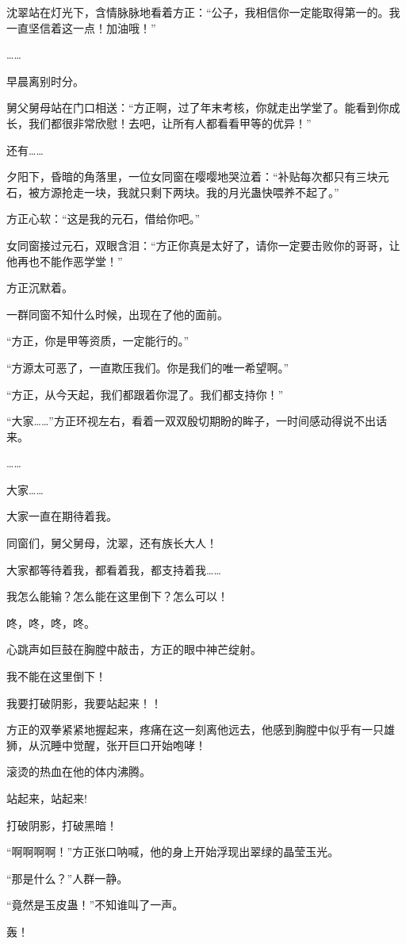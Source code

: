 \begin{this_body}
沈翠站在灯光下，含情脉脉地看着方正：“公子，我相信你一定能取得第一的。我一直坚信着这一点！加油哦！”

……

早晨离别时分。

舅父舅母站在门口相送：“方正啊，过了年末考核，你就走出学堂了。能看到你成长，我们都很非常欣慰！去吧，让所有人都看看甲等的优异！”

还有……

夕阳下，昏暗的角落里，一位女同窗在嘤嘤地哭泣着：“补贴每次都只有三块元石，被方源抢走一块，我就只剩下两块。我的月光蛊快喂养不起了。”

方正心软：“这是我的元石，借给你吧。”

女同窗接过元石，双眼含泪：“方正你真是太好了，请你一定要击败你的哥哥，让他再也不能作恶学堂！”

方正沉默着。

一群同窗不知什么时候，出现在了他的面前。

“方正，你是甲等资质，一定能行的。”

“方源太可恶了，一直欺压我们。你是我们的唯一希望啊。”

“方正，从今天起，我们都跟着你混了。我们都支持你！”

“大家……”方正环视左右，看着一双双殷切期盼的眸子，一时间感动得说不出话来。

……

大家……

大家一直在期待着我。

同窗们，舅父舅母，沈翠，还有族长大人！

大家都等待着我，都看着我，都支持着我……

我怎么能输？怎么能在这里倒下？怎么可以！

咚，咚，咚，咚。

心跳声如巨鼓在胸膛中敲击，方正的眼中神芒绽射。

我不能在这里倒下！

我要打破阴影，我要站起来！！

方正的双拳紧紧地握起来，疼痛在这一刻离他远去，他感到胸膛中似乎有一只雄狮，从沉睡中觉醒，张开巨口开始咆哮！

滚烫的热血在他的体内沸腾。

站起来，站起来!

打破阴影，打破黑暗！

“啊啊啊啊！”方正张口呐喊，他的身上开始浮现出翠绿的晶莹玉光。

“那是什么？”人群一静。

“竟然是玉皮蛊！”不知谁叫了一声。

轰！


\end{this_body}
